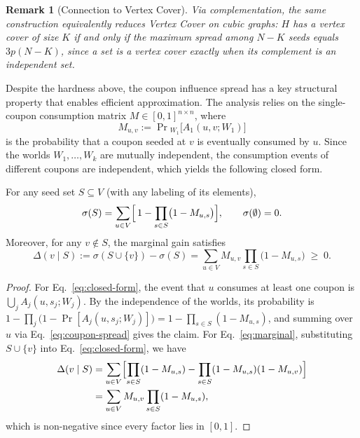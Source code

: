 \documentclass[sigconf]{acmart}
\newtheorem{remark}{Remark}[section]
\begin{document}
\begin{remark}[Connection to Vertex Cover]
\label{rem:vc}
Via complementation, the same construction equivalently reduces
Vertex Cover on cubic graphs: $H$ has a vertex cover of size $K$ if
and only if the maximum spread among $N-K$ seeds equals $3p(N-K)$,
since a set is a vertex cover exactly when its complement is an
independent set.
\end{remark}

Despite the hardness above, the coupon influence spread has a key
structural property that enables efficient approximation.
The analysis relies on the single-coupon consumption matrix
$M\in[0,1]^{n\times n}$, where
\begin{equation}
\label{eq:consume-prob}
M_{u,v}
:=
\Pr{}_{W_1}\bigl[A_1(u,v;W_1)\bigr]
\end{equation}
is the probability that a coupon seeded at $v$ is eventually consumed
by $u$.
Since the worlds $W_1,\ldots,W_k$ are mutually independent, the
consumption events of different coupons are independent, which yields
the following closed form.

\begin{lemma}
\label{lem:closed-form}
For any seed set $S\subseteq V$ (with any labeling of its elements),
\begin{equation}
\label{eq:closed-form}
\sigma(S)
=
\sum_{u\in V}\Bigl[\,1-\prod_{s\in S}\bigl(1-M_{u,s}\bigr)\Bigr],
\qquad
\sigma(\emptyset)=0.
\end{equation}
Moreover, for any $v\notin S$, the marginal gain satisfies
\begin{equation}
\label{eq:marginal}
\Delta(v\mid S)
:=
\sigma(S\cup\{v\})-\sigma(S)
=
\sum_{u\in V} M_{u,v}\prod_{s\in S}\bigl(1-M_{u,s}\bigr)
\;\ge\; 0.
\end{equation}
\end{lemma}

\begin{proof}\renewcommand{\qedsymbol}{}
For Eq.~\eqref{eq:closed-form}, the event that $u$ consumes at least
one coupon is $\bigcup_{j} A_j(u,s_j;W_j)$. By the independence of
the worlds, its probability is
$1-\prod_{j}\bigl(1-\Pr[A_j(u,s_j;W_j)]\bigr)
=1-\prod_{s\in S}(1-M_{u,s})$, and summing over $u$ via
Eq.~\eqref{eq:coupon-spread} gives the claim.
For Eq.~\eqref{eq:marginal}, substituting $S\cup\{v\}$ into
Eq.~\eqref{eq:closed-form}, we have
\begin{align}
\Delta(v\mid S)
&=
\sum_{u\in V}
\Bigl[\prod_{s\in S}(1-M_{u,s})
-\prod_{s\in S}(1-M_{u,s})(1-M_{u,v})\Bigr]\nonumber\\
&=
\sum_{u\in V}M_{u,v}\prod_{s\in S}(1-M_{u,s}),
\end{align}
which is non-negative since every factor lies in $[0,1]$.
\end{proof}
\end{document}
